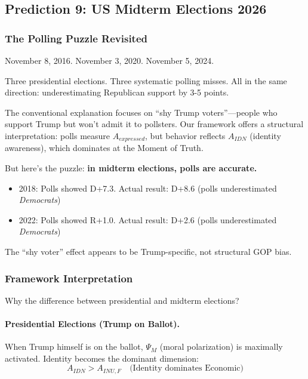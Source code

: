 \subsection{Prediction 9: US Midterm Elections 2026}
\label{subsec:pred9-midterms}


\subsubsection{The Polling Puzzle Revisited}

November 8, 2016. November 3, 2020. November 5, 2024.

Three presidential elections. Three systematic polling misses. All in the 
same direction: underestimating Republican support by 3-5 points.

The conventional explanation focuses on ``shy Trump voters''---people who 
support Trump but won't admit it to pollsters. Our framework offers a 
structural interpretation: polls measure $A_{expressed}$, but behavior 
reflects $A_{IDN}$ (identity awareness), which dominates at the Moment 
of Truth.

But here's the puzzle: \textbf{in midterm elections, polls are accurate.}

\begin{itemize}
    \item 2018: Polls showed D+7.3. Actual result: D+8.6 (polls underestimated \emph{Democrats})
    \item 2022: Polls showed R+1.0. Actual result: D+2.6 (polls underestimated \emph{Democrats})
\end{itemize}

The ``shy voter'' effect appears to be Trump-specific, not structural GOP bias.

\subsubsection{Framework Interpretation}

Why the difference between presidential and midterm elections?

\paragraph{Presidential Elections (Trump on Ballot).}
When Trump himself is on the ballot, $\Psi_M$ (moral polarization) is 
maximally activated. Identity becomes the dominant dimension:
\begin{equation}
A_{IDN} > A_{INU,F} \quad \text{(Identity dominates Economic)}
\end{equation}

